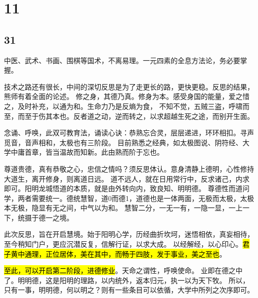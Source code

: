 \section{11}

\subsection{31}

中医、武术、书画、围棋等国术，不离易理。一元四素的全息方法论，务必要掌握。

技术之路还有很长，中间的深切反思是为了走更长的路，更快更稳。反思的结果，熊师有着全面的论述。
修之身，其德乃真。修身为本。感受身国的能量，爱之惜之，及时补充，以通为和。生命力乃是反熵为食，
不知不觉，五贼三盗，呼啸而至，而至于伤其本也。反者道之动，逆而转之，以求超越生死之途，而别开生面。

念诵、呼唤，此双可教育法，诵读心诀：恭熟忘合灵，层层递进，环环相扣。寻声觅音，音声相和，太极也有三阶段。
目前熟悉之经典，如太极图说、阴符经、大学中庸首章，皆当温故而知新。此由熟而阶于忘也。

尊道贵德，真有恭敬之心，忠信之情吗？须反思体认。意身清静上德明，心性修持大道生，离开修身，则离道日远。
道不远人，就在日用常行中，反求诸己，内求即可。阳明龙城悟道的本质，就是由外转向内，致良知、明明德。
尊德性而道问学，两者需要统一。德统慧智，道0而德1，道德也是一体两面，无极而太极，太极本无极，隐显有无之间，中气以为和。
慧智二分，一无一有，一隐一显，一上一下，统摄于德一之境。

此次反思，旨在开启慧境。始于阳明心学，历经曲折坎坷，迷悟相依，真妄相待，至今稍知门户，更应沉潜反复，信解行证，以求大成。
以经解经，以心印心。\hl{君子黄中通理，正位居体，美在其中，而畅于四肢，发于事业，美之至也}。

\hl{至此，可以开启第二阶段，进德修业}。天命之谓性，呼唤使命。
业即在德之中了。明明德，这是阳明的理路，以内统外，返本归元，执一以为天下牧。
所以，只有一事，明明德，何以明之？则有一些条目可以依循，大学中所列之次序即可。
